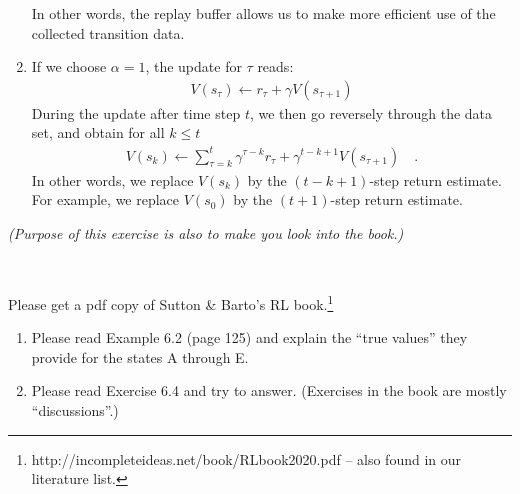 \begin{solution}
\begin{enumerate}
In other words, the replay buffer allows us to make more efficient use of the collected transition data.

\item
If we choose $\alpha=1$, the update for $\tau$ reads:
\begin{align}
    V(s_\tau) \leftarrow r_\tau + \gamma V(s_{\tau + 1})
\end{align}
During the update after time step $t$, we then go reversely through the data set, and obtain for all $k\leq t$
\begin{align}
    V(s_k) \leftarrow \sum_{\tau=k}^t \gamma^{\tau-k} r_\tau + \gamma^{t-k+1} V(s_{\tau + 1}) \quad \text{.}
\end{align}
In other words, we replace $V(s_k)$ by the $(t-k+1)$-step return estimate. For example, we replace $V(s_0)$ by the $(t+1)$-step return estimate.

\end{enumerate}
\end{solution}


\emph{(Purpose of this exercise is also to make you look into the book.)}

~

Please get a pdf copy of Sutton \& Barto's RL book.\footnote{
\url{}http://incompleteideas.net/book/RLbook2020.pdf -- also found in our literature list.} %

\begin{enumerate}
    \item Please read Example 6.2 (page 125) and explain the ``true values'' they provide for the states A through E.
\item Please read Exercise 6.4 and try to answer. (Exercises in the book are mostly ``discussions''.)
\end{enumerate}

